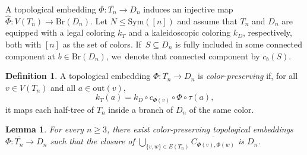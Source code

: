 \documentclass[JEP,XML,SOM,Unicode,NoFloatCountersInSection,published]{cedram}
\theoremstyle{plain}
\newtheorem{lemma}[theorem]{Lemma}
\theoremstyle{definition}
\newtheorem{definition}[theorem]{Definition}
\theoremstyle{remark}
\newcommand{\Sym}{\mathrm{Sym}}
\newcommand{\Br}{\mathrm{Br}}
\begin{document}
A topological embedding $\Phi \colon \overline{T_n} \to D_n$ induces an injective map $\hat{\Phi} \colon V(T_n) \to \Br(D_n)$.
Let $N \leq \Sym([n])$ and assume that $T_n$ and $D_n$ are equipped with a legal coloring $k_T$ and a kaleidoscopic coloring $k_D$, respectively, both with $[n]$ as the set of colors. If~$S \subseteq D_n$ is fully included in some connected component at $b \in \Br(D_n)$, we~denote that connected component by $c_b(S)$.

\begin{definition}
\label{def.color.preserving.embedding}
A topological embedding $\Phi \colon \overline{T_n} \to D_n$ is \emph{color-preserving} if, for all $v \in V(T_n)$ and all $a \in \mathrm{out}(v)$,
\[
 k_T (a) = k_D \circ c_{\Phi(v)} \circ \Phi \circ \tau (a), 
\]
\ie it maps each half-tree of $T_n$ inside a branch of $D_n$ of the same color.
\end{definition}

\begin{lemma}
\label{lem.exist.nice.embeddings}
For every $n \geq 3$, there exist color-preserving topological embeddings $\Phi \colon \overline{T_n} \to D_n$ such that the closure of $\bigcup_{\{v,w\}\in E(T_n)} \overline{C_{\Phi(v),\Phi(w)}}$ is $D_n$.
\end{lemma}
\end{document}
